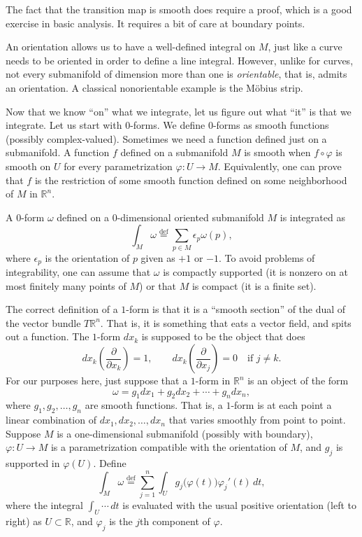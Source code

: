 \documentclass[12pt,openany]{book}
\newcommand{\R}{{\mathbb{R}}}
\theoremstyle{plain}
\theoremstyle{remark}
\theoremstyle{definition}
\theoremstyle{exercise}
\theoremstyle{example}
\begin{document}
The fact that the transition map is smooth does require a proof, which is a
good exercise in basic analysis.  It requires a bit of care at boundary
points.

An orientation allows us to have a well-defined integral on $M$, just
like a curve needs to be oriented in order to define a line integral.
However, unlike for curves, not every submanifold of dimension
more than one is \emph{orientable}, that is, admits an orientation.
A classical nonorientable example is the M\"obius strip.

\medskip

Now that we know ``on'' what we integrate, let us figure out what ``it'' is
that we integrate.  Let us start with $0$-forms.
We define $0$-forms as smooth functions (possibly complex-valued).
Sometimes we need a function defined just on a submanifold.  A function $f$ defined
on a submanifold $M$ is smooth when $f \circ \varphi$ is smooth on $U$
for every parametrization $\varphi \colon U \to M$.  Equivalently,
one can prove that $f$ is the restriction of some smooth function
defined on some neighborhood of $M$ in $\R^n$.

A $0$-form $\omega$ defined on a $0$-dimensional oriented submanifold $M$
is integrated as
\begin{equation*}
\int_M \omega
\overset{\text{def}}{=}
\sum_{p \in M} \epsilon_p \omega(p) ,
\end{equation*}
where $\epsilon_p$ is the orientation of $p$ given as $+1$ or $-1$.
To avoid problems of integrability, 
one can assume that $\omega$ is compactly supported (it is
nonzero on at most finitely many points of $M$) or that $M$ is compact (it
is a finite set).

The correct definition of a $1$-form is that it is a ``smooth section'' of
the dual of the vector bundle $T \R^n$.  That is, it is something that eats
a vector field, and spits out a function.  The $1$-form
$dx_k$ is supposed to be the object that does
\begin{equation*}
dx_k\left(
\frac{\partial}{\partial x_k}
\right)
=
1,
\qquad
dx_k\left(
\frac{\partial}{\partial x_j}
\right)
=
0 \quad \text{if $j\not=k$}.
\end{equation*}
For our purposes here, just suppose that a $1$-form
in $\R^n$ is an object of the form
\begin{equation*}
\omega = g_1 dx_1 + g_2 dx_2 + \cdots + g_n dx_n ,
\end{equation*}
where $g_1, g_2, \ldots, g_n$ are smooth functions.  That is, a $1$-form is
at each point a linear combination of $dx_1, dx_2, \ldots, dx_n$ that
varies smoothly from point to point.
Suppose $M$ is a one-dimensional submanifold
(possibly with boundary), $\varphi \colon U \to M$
is a parametrization compatible with the orientation of $M$,
and $g_j$ is supported in $\varphi(U)$.
Define
\begin{equation*}
\int_M \omega
\overset{\text{def}}{=}
\sum_{j=1}^n
\int_U g_j\bigl( \varphi(t) \bigr) \varphi_j'(t) \, dt ,
\end{equation*}
where the integral $\int_U \cdots \, dt$
is evaluated with the usual positive orientation
(left to right) as $U \subset \R$, and $\varphi_j$ is the $j$th component
of $\varphi$.
\end{document}
